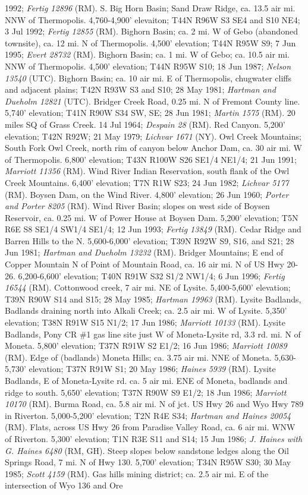 1992; \textit{Fertig 12896} (RM).  S. Big Horn Basin; Sand Draw Ridge, ca. 13.5 air mi. NNW of Thermopolis. 4,760-4,900' elevaiton; T44N R96W S3 SE4 and S10 NE4; 3 Jul 1992; \textit{Fertig 12855} (RM).  Bighorn Basin; ca. 2 mi. W of Gebo (abandoned townsite), ca. 12 mi. N of Thermopolis. 4,500' elevation; T44N R95W S9; 7 Jun 1995; \textit{Evert 28732} (RM).  Bighorn Basin; ca. 1 mi. W of Gebo; ca. 10.5 air mi. NNW of Thermopolis.	4,500' elevation; T44N R95W S10; 18 Jun 1987; \textit{Nelson 13540} (UTC).  Bighorn Basin; ca. 10 air mi. E of Thermopolis, chugwater cliffs and adjacent plains; T42N R93W S3 and S10; 28 May 1981; \textit{Hartman and Dueholm 12821} (UTC).  Bridger Creek Road, 0.25 mi. N of Fremont County line. 5,740' elevation; T41N R90W S34 SW, SE; 	28 Jun 1981; \textit{Martin 1575} (RM).  20 miles SQ of Grass Creek. 14 Jul 1964; \textit{Despain 28} (RM).  Red Canyon. 5,200' elevation; T42N R92W; 21 May 1979; \textit{Lichvar 1671} (NY).  Owl Creek Mountains; South Fork Owl Creek, north rim of canyon below Anchor Dam, ca. 30 air mi. W of Thermopolis. 6,800' elevation; T43N R100W S26	SE1/4 NE1/4; 21 Jun 1991; \textit{Marriott 11356} (RM).  Wind River Indian Reservation, south flank of the Owl Creek Mountains. 6,400' elevation; T7N R1W S23; 24 Jun 1982; \textit{Lichvar 5177} (RM).  Boysen Dam, on the Wind River. 4,800' elevation; 26 Jun 1960; \textit{Porter and Porter 8205} (RM).  Wind River Basin; slopes on west side of Boysen Reservoir, ca. 0.25 mi. W of Power House at Boysen Dam. 5,200' elevation; T5N R6E S8	SE1/4 SW1/4 SE1/4; 12 Jun 1993; \textit{Fertig 13849} (RM).  Cedar Ridge and Barren Hills to the N. 5,600-6,000' elevation; T39N R92W S9, S16, and S21; 28 Jun 1981; \textit{Hartman and Dueholm 13232} (RM).  Bridger Mountains; E end of Copper Mountain N of Point of Mountain Road, ca. 16 air mi. N of US Hwy 20-26. 6,200-6,600' elevation; T40N R91W S32	S1/2 NW1/4; 6 Jun 1996; \textit{Fertig 16544} (RM).  Cottonwood creek, 7 air mi. NE of Lysite. 5,400-5,600' elevation; T39N R90W S14 and S15; 28 May 1985; \textit{Hartman 19963} (RM).  Lysite Badlands, Badlands draining north into Alkali Creek; ca. 2.5 air mi. W of Lysite. 5,350' elevation; T38N R91W S15	N1/2; 17 Jun 1986; \textit{Marriott 10133} (RM).  Lysite Badlands, Pony CR \#1 gas line site just W of Moneta-Lysite rd, 3.3 rd. mi. N of Moneta. 5,800' elevation; T37N R91W S2	E1/2; 16 Jun 1986; \textit{Marriott 10089} (RM).  Edge of (badlands) Moneta Hills; ca. 3.75 air mi. NNE of Moneta. 5,630-5,730' elevation; T37N R91W S1; 20 May 1986; \textit{Haines 5939} (RM).  Lysite Badlands, E of Moneta-Lysite rd. ca. 5 air mi. ENE of Moneta, badlands and ridge to south. 5,650' elevation; T37N R90W S9	E1/2; 18 Jun 1986; \textit{Marriott 10170} (RM).  Burma Road, ca. 5.8 air mi. N of jct. US Hwy 26 and Wyo Hwy 789 in Riverton. 5,000-5,200' elevation; T2N R4E S34; \textit{Hartman and Haines 20054} (RM).  Flats, across US Hwy 26 from Paradise Valley Road, ca. 6 air mi. WNW of Riverton. 5,300' elevation; T1N R3E S11 and S14; 15 Jun 1986; \textit{J. Haines with G. Haines 6480} (RM, GH).  Steep slopes below sandstone ledges along the Oil Springs Road, 7 mi. N of Hwy 130. 5,700' elevation; T34N R95W S30; 30 May 1985; \textit{Scott 4159} (RM).  Gas hills mining district; ca. 2.5 air mi. E of the intersection of Wyo 136 and Ore 